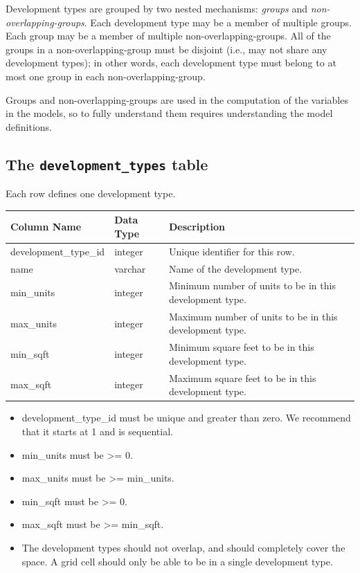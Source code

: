 Development types are grouped by two nested mechanisms: \emph{groups} and
\emph{non-overlapping-groups}. Each development type may be a member of
multiple groups. Each group may be a member of multiple
non-overlapping-groups. All of the groups in a non-overlapping-group must be
disjoint (i.e., may not share any development types); in other words, each
development type must belong to at most one group in each
non-overlapping-group.

Groups and non-overlapping-groups are used in the computation of the variables \variablesindex
in the models, so to fully understand them requires understanding the model \modelsindex
definitions.

\subsection{The {\tt development_types} table}

Each row defines one development type.

\begin{tabular}{|l|l|l|}

\hline
\textbf{Column Name} & \textbf{Data Type} & \textbf{Description} \\

\hline development_type_id & integer & Unique identifier for this row.  \\

\hline name & varchar & Name of the development type.  \\

\hline min_units & integer & Minimum number of units to be in this development
type.  \\

\hline max_units & integer & Maximum number of units to be in this development
type.  \\

\hline min_sqft & integer & Minimum square feet to be in this development type.
\\

\hline max_sqft & integer & Maximum square feet to be in this development type.
\\

\hline

\end{tabular}

\begin{itemize}
\tight
\item development_type_id must be unique and greater than zero. We recommend that it starts at 1 and is sequential.
\item min_units must be \textgreater{}= 0.
\item max_units must be \textgreater{}= min_units.
\item min_sqft must be \textgreater{}= 0.
\item max_sqft must be \textgreater{}= min_sqft.
\item The development types should not overlap, and should completely cover the
space.  A grid cell should only be able to be in a single development type.
\end{itemize}

